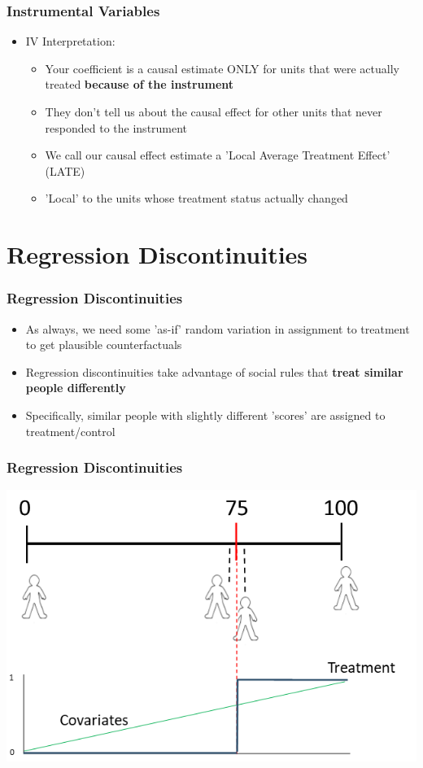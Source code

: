 \documentclass[xcolor=x11names,compress]{beamer}\usepackage[]{graphicx}\usepackage[]{color}
\renewcommand{\(}{\begin{columns}}
\renewcommand{\)}{\end{columns}}
\newcommand{\<}[1]{\begin{column}{#1}}
\renewcommand{\>}{\end{column}}
\begin{document}
\begin{frame}
\frametitle{Instrumental Variables}
\begin{itemize}
\item IV Interpretation:
\pause
\begin{itemize}
\item Your coefficient is a causal estimate ONLY for units that were actually treated \textbf{because of the instrument}
\pause
\item They don't tell us about the causal effect for other units that never responded to the instrument
\pause
\item We call our causal effect estimate a 'Local Average Treatment Effect' (LATE)
\item 'Local' to the units whose treatment status actually changed
\end{itemize}
\end{itemize}
\end{frame}



\section{Regression Discontinuities}

\begin{frame}
\frametitle{Regression Discontinuities}
\begin{itemize}
\item As always, we need some 'as-if' random variation in assignment to treatment to get plausible counterfactuals
\pause
\item Regression discontinuities take advantage of social rules that \textbf{treat similar people differently}
\pause
\item Specifically, similar people with slightly different 'scores' are assigned to treatment/control
\end{itemize}
\end{frame}

\begin{frame}
\frametitle{Regression Discontinuities}
\begin{center}
\includegraphics[scale=0.45]{Scale.png}
\end{center}
\end{frame}
\end{document}
